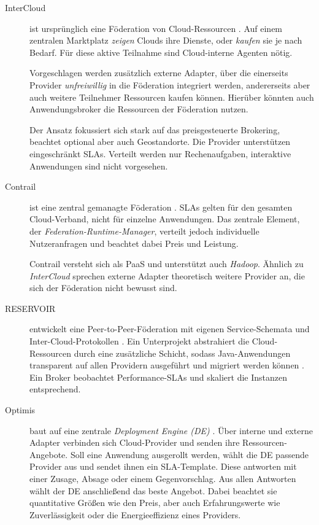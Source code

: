 \begin{description}	
	
	
	\item[InterCloud] ist ursprünglich eine Föderation von Cloud-Ressourcen \cite{buyya:2010:intercloud}. Auf einem zentralen Marktplatz \emph{zeigen} Clouds ihre Dienste, oder \emph{kaufen} sie je nach Bedarf. Für diese aktive Teilnahme sind Cloud-interne Agenten nötig.
	
	Vorgeschlagen werden zusätzlich externe Adapter, über die einerseits Provider \emph{unfreiwillig} in die Föderation integriert werden, andererseits aber auch weitere Teilnehmer Ressourcen kaufen können. Hierüber könnten auch Anwendungsbroker die Ressourcen der Föderation nutzen.
	
	Der Ansatz fokussiert sich stark auf das preisgesteuerte Brokering, beachtet optional aber auch Geostandorte. Die Provider unterstützen eingeschränkt SLAs. Verteilt werden nur Rechenaufgaben, interaktive Anwendungen sind nicht vorgesehen.
	
	\item[Contrail] ist eine zentral gemanagte Föderation \cite{carlini:2011:contrail}. SLAs gelten für den gesamten Cloud-Verband, nicht für einzelne Anwendungen. Das zentrale Element, der \emph{Federation-Runtime-Manager}, verteilt jedoch individuelle Nutzeranfragen und beachtet dabei Preis und Leistung.
	

	Contrail versteht sich als PaaS und unterstützt auch \emph{Hadoop}. Ähnlich zu \emph{InterCloud} sprechen externe Adapter theoretisch weitere Provider an, die sich der Föderation nicht bewusst sind.
			
	
	\item[RESERVOIR] entwickelt eine Peer-to-Peer-Föderation mit eigenen Service-Schemata und Inter-Cloud-Protokollen \cite{rochwerger:2009:reservoir}. Ein Unterprojekt abstrahiert die Cloud-Ressourcen durch eine zusätzliche Schicht, sodass Java-Anwendungen transparent auf allen Providern ausgeführt und migriert werden können \cite{rochwerger:2011:reservoir-multi-cloud}. Ein Broker beobachtet Performance-SLAs und skaliert die Instanzen entsprechend.
	
	
	\item[Optimis] baut auf eine zentrale \emph{Deployment Engine (DE)} \cite{ferrer:2012:optimis}. Über interne und externe Adapter verbinden sich Cloud-Provider und senden ihre Ressourcen-Angebote. Soll eine Anwendung ausgerollt werden, wählt die DE passende Provider aus und sendet ihnen ein SLA-Template. Diese antworten mit einer Zusage, Absage oder einem Gegenvorschlag. Aus allen Antworten wählt der DE anschließend das beste Angebot. Dabei beachtet sie quantitative Größen wie den Preis, aber auch Erfahrungswerte wie Zuverlässigkeit oder die Energieeffizienz eines Providers.
	

\end{description}
